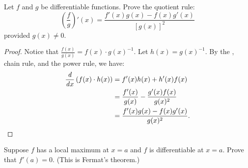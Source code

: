 \begin{problem}
  Let $f$ and $g$ be differentiable functions. Prove the quotient rule:
    \begin{equation*}
      \left(\frac{f}{g}\right)' (x) = \frac{f'(x)g(x) - f(x)g'(x)}{[g(x)]^2}
    \end{equation*}
  provided $g(x) \neq 0$.

  \begin{proof}
    Notice that $\frac{f(x)}{g(x)} = f(x) \cdot g(x)^{-1}$.
    Let $h(x) = g(x)^{-1}$. By the , chain rule, and the power
    rule, we have:
    \begin{align*}
        \dfrac{\mathit{d} }{\mathit{d} x} \left( f(x) \cdot {h(x)} \right) &= f'(x)h(x) + h'(x)f(x)\\
                                                    &= \frac{f'(x)}{g(x)} -\frac{g'(x) f(x)}{g(x)^{2}}\\
                                                    &= \frac{f'(x) g(x) - f(x) g'(x)} {g(x)^2}.
    \end{align*}
  \end{proof}

\end{problem}

\begin{problem}
  Suppose $f$ has a local maximum at $x = a$ and $f$ is differentiable at $x = a$.
  Prove that $f'(a) = 0$. (This is Fermat's theorem.)
\end{problem}
